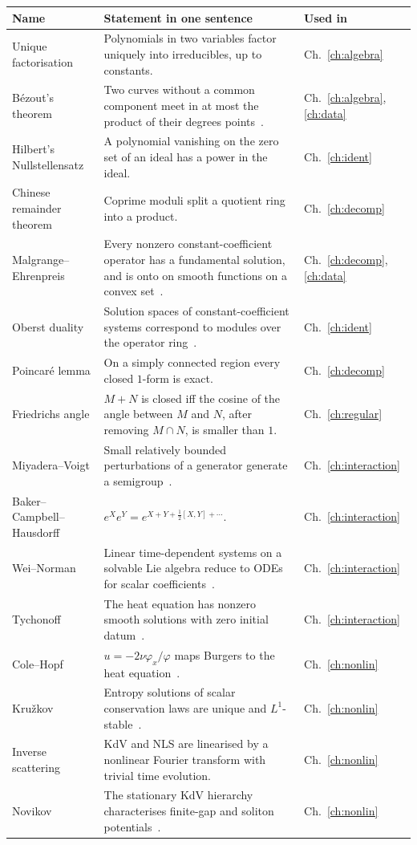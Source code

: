 \documentclass[11pt]{article}
\theoremstyle{plain}
\theoremstyle{definition}
\theoremstyle{remark}
\begin{document}
\begin{center}\small
\begin{longtable}{@{}L{3.5cm}L{8.6cm}L{2.2cm}@{}}
\toprule
Name & Statement in one sentence & Used in\\\midrule\endhead
Unique factorisation & Polynomials in two variables factor uniquely into irreducibles, up to constants. & Ch.~\ref{ch:algebra}\\
B\'ezout's theorem & Two curves without a common component meet in at most the product of their degrees points~\cite{fu}. & Ch.~\ref{ch:algebra}, \ref{ch:data}\\
Hilbert's Nullstellensatz & A polynomial vanishing on the zero set of an ideal has a power in the ideal. & Ch.~\ref{ch:ident}\\
Chinese remainder theorem & Coprime moduli split a quotient ring into a product. & Ch.~\ref{ch:decomp}\\
Malgrange--Ehrenpreis & Every nonzero constant-coefficient operator has a fundamental solution, and is onto on smooth functions on a convex set~\cite{eh,ma}. & Ch.~\ref{ch:decomp}, \ref{ch:data}\\
Oberst duality & Solution spaces of constant-coefficient systems correspond to modules over the operator ring~\cite{ob}. & Ch.~\ref{ch:ident}\\
Poincar\'e lemma & On a simply connected region every closed $1$-form is exact. & Ch.~\ref{ch:decomp}\\
Friedrichs angle & $M+N$ is closed iff the cosine of the angle between $M$ and $N$, after removing $M\cap N$, is smaller than $1$. & Ch.~\ref{ch:regular}\\
Miyadera--Voigt & Small relatively bounded perturbations of a generator generate a semigroup~\cite{en}. & Ch.~\ref{ch:interaction}\\
Baker--Campbell--Hausdorff & $e^Xe^Y=e^{X+Y+\frac12[X,Y]+\cdots}$. & Ch.~\ref{ch:interaction}\\
Wei--Norman & Linear time-dependent systems on a solvable Lie algebra reduce to ODEs for scalar coefficients~\cite{wn}. & Ch.~\ref{ch:interaction}\\
Tychonoff & The heat equation has nonzero smooth solutions with zero initial datum~\cite{fj}. & Ch.~\ref{ch:interaction}\\
Cole--Hopf & $u=-2\nu\varphi_x/\varphi$ maps Burgers to the heat equation~\cite{ch}. & Ch.~\ref{ch:nonlin}\\
Kru\v zkov & Entropy solutions of scalar conservation laws are unique and $L^1$-stable~\cite{kr}. & Ch.~\ref{ch:nonlin}\\
Inverse scattering & KdV and NLS are linearised by a nonlinear Fourier transform with trivial time evolution. & Ch.~\ref{ch:nonlin}\\
Novikov & The stationary KdV hierarchy characterises finite-gap and soliton potentials~\cite{no}. & Ch.~\ref{ch:nonlin}\\
\bottomrule
\end{longtable}
\end{center}
\end{document}
